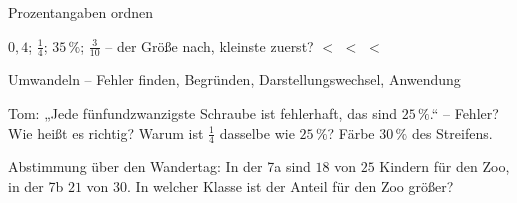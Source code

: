 \begin{aufgabe}{Prozentangaben ordnen}
\begin{teile}
\teil $0{,}4$; $\frac{1}{4}$; $35\,\%$; $\frac{3}{10}$ – der Größe nach, kleinste zuerst? \leerfeld $<$ \leerfeld $<$ \leerfeld $<$ \leerfeld
\end{teile}
\end{aufgabe}

\begin{aufgabe}{Umwandeln – Fehler finden, Begründen, Darstellungswechsel, Anwendung}
\begin{teile}
\teil Tom: „Jede fünfundzwanzigste Schraube ist fehlerhaft, das sind $25\,\%$.“ – Fehler? Wie heißt es richtig?
\teil Warum ist $\frac{1}{4}$ dasselbe wie $25\,\%$?
\teil Färbe $30\,\%$ des Streifens.

\streifenleer
\teil Abstimmung über den Wandertag: In der 7a sind $18$ von $25$ Kindern für den Zoo, in der 7b $21$ von $30$. In welcher Klasse ist der Anteil für den Zoo größer?
\end{teile}
\end{aufgabe}
